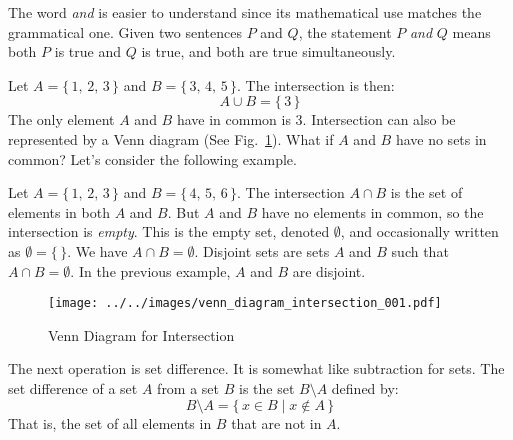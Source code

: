 \documentclass{article}
\theoremstyle{plain}
\theoremstyle{normal}
\newenvironment{example}{%
    \pushQED{\qed}\renewcommand{\qedsymbol}{$\blacksquare$}\examplex%
}{%
    \popQED\endexamplex%
}
\newenvironment{definition}{%
    \pushQED{\qed}\renewcommand{\qedsymbol}{$\blacksquare$}\definitionx%
}{%
    \popQED\enddefinitionx%
}
\begin{document}
        The word \textit{and} is easier to understand since its mathematical
        use matches the grammatical one. Given two sentences $P$ and $Q$,
        the statement $P$ \textit{and} $Q$ means both $P$ is true and $Q$ is
        true, and both are true simultaneously.
        \begin{example}
            Let $A=\{\,1,\,2,\,3\,\}$ and $B=\{\,3,\,4,\,5\,\}$. The
            intersection is then:
            \begin{equation}
                A\cup{B}=\{\,3\,\}
            \end{equation}
            The only element $A$ and $B$ have in common is 3.
        \end{example}
        Intersection can also be represented by a Venn diagram
        (See Fig.~\ref{fig:venn_diagram_intersection_001}). What if $A$ and $B$
        have no sets in common? Let's consider the following example.
        \begin{example}
            Let $A=\{\,1,\,2,\,3\,\}$ and $B=\{\,4,\,5,\,6\,\}$. The
            intersection $A\cap{B}$ is the set of elements in both $A$ and $B$.
            But $A$ and $B$ have no elements in common, so the intersection
            is \textit{empty}. This is the empty set, denoted $\emptyset$, and
            occasionally written as $\emptyset=\{\,\}$. We have
            $A\cap{B}=\emptyset$.
        \end{example}
        Disjoint sets are sets $A$ and $B$ such that $A\cap{B}=\emptyset$.
        In the previous example, $A$ and $B$ are disjoint.
        \par\hfill\par
        \begin{figure}
            \centering
            \texttt{[image: ../../images/venn\_diagram\_intersection\_001.pdf]}
            \caption{Venn Diagram for Intersection}
            \label{fig:venn_diagram_intersection_001}
        \end{figure}
        The next operation is set difference. It is somewhat like subtraction
        for sets.
        \begin{definition}[\textbf{Set Difference}]
            The set difference of a set $A$ from a set $B$ is the set
            $B\setminus{A}$ defined by:
            \begin{equation}
                B\setminus{A}=\{\,x\in{B}\;|\;x\notin{A}\,\}
            \end{equation}
            That is, the set of all elements in $B$ that are not in $A$.
        \end{definition}
\end{document}
